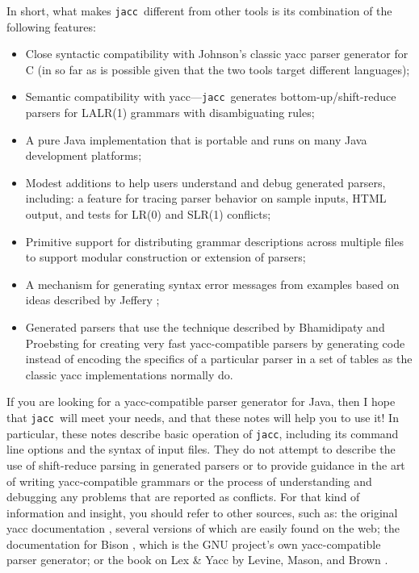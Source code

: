 \documentclass[12pt]{article}
\def\jacc{{\tt jacc}}
\begin{document}
In short, what makes \jacc\ different from other tools is its
combination of the following features:
\begin{itemize}
\item Close syntactic compatibility with Johnson's classic yacc
      parser generator for C (in so far as is possible given
      that the two tools target different languages);

\item Semantic compatibility with yacc---\jacc\ generates
      bottom-up/shift-reduce parsers for LALR(1) grammars
      with disambiguating rules;

\item A pure Java implementation that is portable and runs on
      many Java development platforms;

\item Modest additions to help users understand and debug
      generated parsers, including: a feature for tracing
      parser behavior on sample inputs, HTML output, and
      tests for LR(0) and SLR(1) conflicts;

\item Primitive support for distributing grammar descriptions
      across multiple files to support modular construction
      or extension of parsers;

\item A mechanism for generating syntax error messages from examples
      based on ideas described by Jeffery \cite{Jeffery:merr};

\item Generated parsers that use the technique described by
      Bhamidipaty and Proebsting \cite{mule} for creating
      very fast yacc-compatible parsers by generating code
      instead of encoding the specifics of a particular
      parser in a set of tables as the classic yacc
      implementations normally do.
\end{itemize}
If you are looking for a yacc-compatible parser generator
for Java, then I hope that \jacc\ will meet your needs,
and that these notes will help you to use it! 
In particular, these notes describe basic operation of \jacc,
including its command line options and the syntax of input
files.  They do not attempt to describe the use of shift-reduce
parsing in generated parsers or to provide guidance in the
art of writing yacc-compatible grammars or the process of
understanding and debugging any problems that are reported
as conflicts.  For that kind of information and insight,
you should refer to other sources, such as: the original
yacc documentation \cite{Johnson:yacc}, several versions of
which are easily found on the web; the documentation for Bison
\cite{bison}, which is the GNU project's own yacc-compatible
parser generator; or the book on Lex \& Yacc by Levine, Mason,
and Brown \cite{LevineMasonBrown:lex+yacc}.
\end{document}
